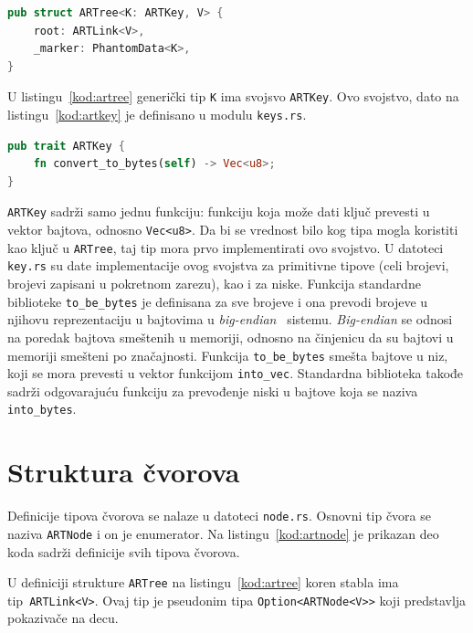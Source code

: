 \documentclass[12pt,oneside]{memoir}
\begin{document}
\begin{lstlisting}[language=Rust,
                   caption={Definicija strukture \texttt{ARTree}},
                   label={kod:artree}]
pub struct ARTree<K: ARTKey, V> {
    root: ARTLink<V>,
    _marker: PhantomData<K>,
}
\end{lstlisting}

U listingu~\ref{kod:artree} generički tip \texttt{K} ima svojsvo \texttt{ARTKey}.
Ovo svojstvo, dato na listingu~\ref{kod:artkey} je definisano u
modulu \texttt{keys.rs}.

\begin{lstlisting}[language=Rust,
                   caption={Definicija svojstva \texttt{ARTKey}},
                   label={kod:artkey}]
pub trait ARTKey {
    fn convert_to_bytes(self) -> Vec<u8>;
}
\end{lstlisting}

\texttt{ARTKey} sadrži samo jednu funkciju: funkciju koja može dati ključ
prevesti u vektor bajtova, odnosno \texttt{Vec<u8>}. Da bi se vrednost
bilo kog tipa mogla koristiti kao ključ u \texttt{ARTree}, taj tip mora prvo
implementirati ovo svojstvo. U datoteci \texttt{key.rs} su date
implementacije ovog svojstva za primitivne tipove (celi brojevi, brojevi zapisani
u pokretnom zarezu), kao i za niske. Funkcija standardne biblioteke
\texttt{to\_be\_bytes} je definisana za sve brojeve i ona prevodi brojeve u
njihovu reprezentaciju u bajtovima u \textit{big-endian}~\cite{endianness}
sistemu. \textit{Big-endian} se odnosi na poredak bajtova smeštenih u memoriji,
odnosno na činjenicu da su bajtovi u memoriji smešteni po značajnosti.
Funkcija \texttt{to\_be\_bytes} smešta bajtove u niz,
koji se mora prevesti u vektor funkcijom \texttt{into\_vec}.
Standardna biblioteka takođe sadrži odgovarajuću funkciju za prevođenje
niski u bajtove koja se naziva \texttt{into\_bytes}.

\section{Struktura čvorova}
Definicije tipova čvorova se nalaze u datoteci \texttt{node.rs}.
Osnovni tip čvora se naziva \texttt{ARTNode} i on je enumerator.
Na listingu~\ref{kod:artnode} je prikazan deo koda sadrži definicije
svih tipova čvorova.

U definiciji strukture \texttt{ARTree} na listingu~\ref{kod:artree}
koren stabla ima tip~\texttt{ARTLink<V>}. Ovaj tip je
pseudonim tipa \texttt{Option<ARTNode<V>>} koji predstavlja
pokazivače na decu.
\end{document}
